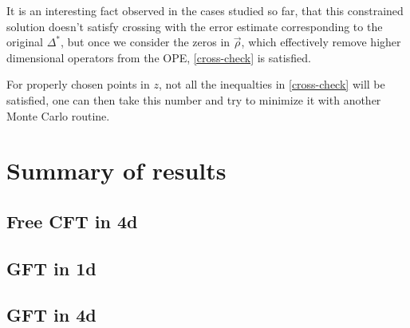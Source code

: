 \documentclass[letterpaper]{article}
\numberwithin{equation}{section}
\begin{document}
It is an interesting fact observed in the cases studied so far, that this
constrained solution doesn't satisfy crossing with the error estimate
corresponding to the original $\Delta^*$, but once we consider the zeros in
$\vec{\rho}$, which effectively remove higher dimensional operators from the
OPE, \ref{cross-check} is satisfied.

For properly chosen
points in $z$, not all the inequalties in \ref{cross-check} will be satisfied,
one can then take this number and try to minimize it with another Monte Carlo
routine.

\section{Summary of results}
\subsection{Free CFT in 4d}
\subsection{GFT in 1d}
\subsection{GFT in 4d}
\end{document}
